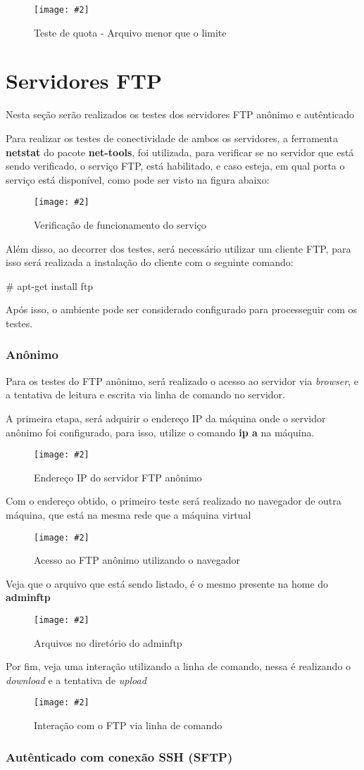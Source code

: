 \documentclass[
	12pt,				%
	openright,			%
	twoside,			%
	openany,			%
	a4paper,			%
	chapter=TITLE,		%
	section=TITLE,		%
	subsection=TITLE,	%
	subsubsection=TITLE,%
	english,
	brazil				%
]{abntex2}
\newcommand{\includeImage}[3] {

\begin{figure}[H]
 	 \centering
  		\texttt{[image: \#2]}
  	\caption{#3}
\end{figure}

}
\begin{document}
\includeImage{0.5}{../imgs/3_quota/2_test.png}{Teste de quota - Arquivo menor que o limite}

\section{Servidores FTP}

Nesta seção serão realizados os testes dos servidores FTP anônimo e autênticado

Para realizar os testes de conectividade de ambos os servidores, a ferramenta \textbf{netstat} do pacote \textbf{net-tools}, foi utilizada, para verificar se no servidor que está sendo verificado, o serviço FTP, está habilitado, e caso esteja, em qual porta o serviço está disponível, como pode ser visto na figura abaixo:

\includeImage{0.5}{../imgs/4_ftp_sem_autenticacao/1_test.png}{Verificação de funcionamento do serviço}

Além disso, ao decorrer dos testes, será necessário utilizar um cliente FTP, para isso será realizada a instalação do cliente com o seguinte comando:

\# apt-get install ftp

Após isso, o ambiente pode ser considerado configurado para processeguir com os testes.

\subsubsection{Anônimo}

Para os testes do FTP anônimo, será realizado o acesso ao servidor via \textit{browser}, e a tentativa de leitura e escrita via linha de comando no servidor.

A primeira etapa, será adquirir o endereço IP da máquina onde o servidor anônimo foi configurado, para isso, utilize o comando \textbf{ip a} na máquina.

\includeImage{0.5}{../imgs/4_ftp_sem_autenticacao/2_test.png}{Endereço IP do servidor FTP anônimo}

Com o endereço obtido, o primeiro teste será realizado no navegador de outra máquina, que está na mesma rede que a máquina virtual

\includeImage{0.5}{../imgs/4_ftp_sem_autenticacao/3_test.png}{Acesso ao FTP anônimo utilizando o navegador}

Veja que o arquivo que está sendo listado, é o mesmo presente na home do \textbf{adminftp}

\includeImage{0.5}{../imgs/4_ftp_sem_autenticacao/4_test.png}{Arquivos no diretório do adminftp}

Por fim, veja uma interação utilizando a linha de comando, nessa é realizando o \textit{download} e a tentativa de \textit{upload}

\includeImage{0.5}{../imgs/4_ftp_sem_autenticacao/5_test.png}{Interação com o FTP via linha de comando}

\subsubsection{Autênticado com conexão SSH (SFTP)}
\end{document}
